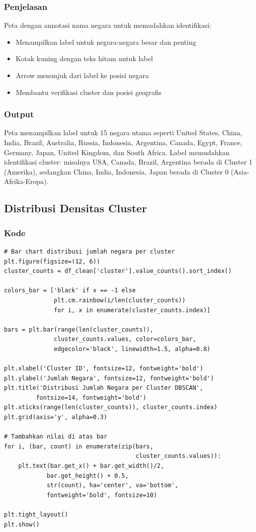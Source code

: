 \documentclass[12pt,a4paper]{article}
\begin{document}
\subsubsection{Penjelasan}
Peta dengan annotasi nama negara untuk memudahkan identifikasi:
\begin{itemize}
    \item Menampilkan label untuk negara-negara besar dan penting
    \item Kotak kuning dengan teks hitam untuk label
    \item Arrow menunjuk dari label ke posisi negara
    \item Membantu verifikasi cluster dan posisi geografis
\end{itemize}

\subsubsection{Output}
Peta menampilkan label untuk 15 negara utama seperti United States, China, India, Brazil, Australia, Russia, Indonesia, Argentina, Canada, Egypt, France, Germany, Japan, United Kingdom, dan South Africa. Label memudahkan identifikasi cluster: misalnya USA, Canada, Brazil, Argentina berada di Cluster 1 (Amerika), sedangkan China, India, Indonesia, Japan berada di Cluster 0 (Asia-Afrika-Eropa).

\subsection{Distribusi Densitas Cluster}

\subsubsection{Kode}
\begin{lstlisting}[style=pythonstyle]
# Bar chart distribusi jumlah negara per cluster
plt.figure(figsize=(12, 6))
cluster_counts = df_clean['cluster'].value_counts().sort_index()

colors_bar = ['black' if x == -1 else 
              plt.cm.rainbow(i/len(cluster_counts)) 
              for i, x in enumerate(cluster_counts.index)]

bars = plt.bar(range(len(cluster_counts)), 
              cluster_counts.values, color=colors_bar, 
              edgecolor='black', linewidth=1.5, alpha=0.8)

plt.xlabel('Cluster ID', fontsize=12, fontweight='bold')
plt.ylabel('Jumlah Negara', fontsize=12, fontweight='bold')
plt.title('Distribusi Jumlah Negara per Cluster DBSCAN', 
         fontsize=14, fontweight='bold')
plt.xticks(range(len(cluster_counts)), cluster_counts.index)
plt.grid(axis='y', alpha=0.3)

# Tambahkan nilai di atas bar
for i, (bar, count) in enumerate(zip(bars, 
                                     cluster_counts.values)):
    plt.text(bar.get_x() + bar.get_width()/2, 
            bar.get_height() + 0.5, 
            str(count), ha='center', va='bottom', 
            fontweight='bold', fontsize=10)

plt.tight_layout()
plt.show()
\end{lstlisting}
\end{document}
